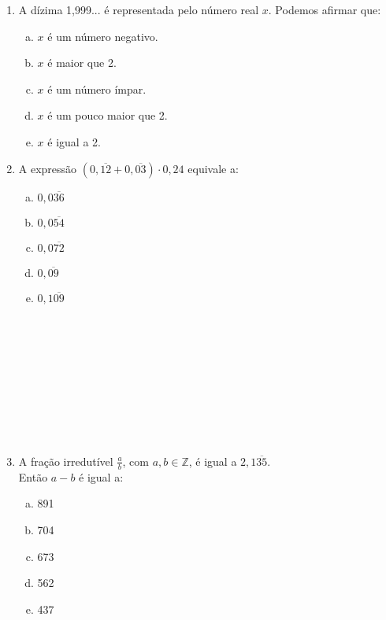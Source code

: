 \documentclass[a4paper,14pt]{article}
\begin{document}
\begin{multicols}{2}
\begin{enumerate}
			\normalsize\item A dízima 1,999... é representada pelo número real $x$. Podemos afirmar que:
			\begin{enumerate}[a)]
				\item $x$ é um número negativo.
				\item $x$ é maior que 2.
				\item $x$ é um número ímpar.
				\item $x$ é um pouco maior que 2.
				\item $x$ é igual a 2. \newpage
			\end{enumerate}
			\item A expressão $(0,\overline{12} + 0,\overline{03}) \cdot 0,24$ equivale a:
			\begin{enumerate}[a)]
				\item $0,0\overline{36}$
				\item $0,0\overline{54}$
				\item $0,0\overline{72}$
				\item $0,\overline{09}$
				\item $0,1\overline{09}$ \\\\\\\\\\\\\\\\\\\\
			\end{enumerate}
			\item A fração irredutível $\frac{a}{b}$, com $a, b \in \mathbb{Z}$, é igual a $2,1\overline{35}$. \\
			Então $a - b$ é igual a:
			\begin{enumerate}[a)]
				\item 891
				\item 704
				\item 673
				\item 562
				\item 437 \\\\\\\\\\\\\\\\\\\\

\end{enumerate}
\end{enumerate}
\end{multicols}
\end{document}
